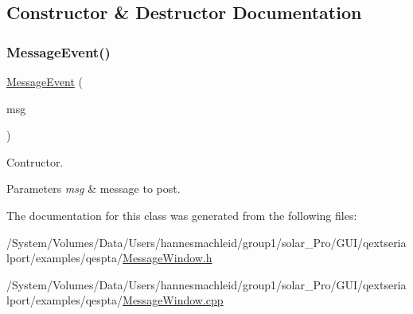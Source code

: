 \subsection{Constructor \& Destructor Documentation}
\mbox{\label{class_message_event_a19d713493077b51a9e802895d7389b86}} 
\subsubsection{\texorpdfstring{MessageEvent()}{MessageEvent()}}
{\footnotesize\ttfamily \mbox{\hyperlink{class_message_event}{Message\+Event}} (\begin{DoxyParamCaption}\item[{Q\+String \&}]{msg }\end{DoxyParamCaption})}

Contructor. 
\begin{DoxyParams}{Parameters}
{\em msg} & message to post. \\
\hline
\end{DoxyParams}


The documentation for this class was generated from the following files\+:\begin{DoxyCompactItemize}
\item 
/\+System/\+Volumes/\+Data/\+Users/hannesmachleid/group1/solar\+\_\+\+Pro/\+G\+U\+I/qextserialport/examples/qespta/\mbox{\hyperlink{_message_window_8h}{Message\+Window.\+h}}\item 
/\+System/\+Volumes/\+Data/\+Users/hannesmachleid/group1/solar\+\_\+\+Pro/\+G\+U\+I/qextserialport/examples/qespta/\mbox{\hyperlink{_message_window_8cpp}{Message\+Window.\+cpp}}\end{DoxyCompactItemize}
